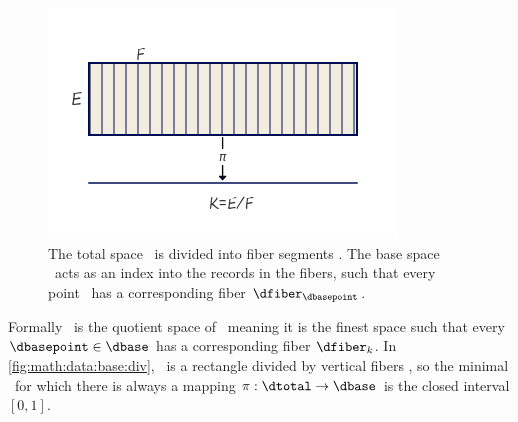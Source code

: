 \documentclass[../main.tex]{subfiles}
\begin{document}
\begin{figure}[H]
    \includegraphics[width=\linewidth]{figures/math/k_qspace.png}
    \caption{The total space \dtotal\ is divided into fiber segments \dfiber. The base space \dbase\ acts as an index into the records in the fibers, such that every point \dbasepoint\ has a corresponding fiber $\dfiber_{\dbasepoint}$.}
    \label{fig:math:data:base:div}
\end{figure}

Formally \dbase\ is the quotient space \cite{QuotientSpaceTopology2020} of \dtotal\, meaning it is the finest space\cite{aurouxMath131Introduction} such that every $\dbasepoint \in \dbase$ has a corresponding fiber $\dfiber_k$\cite{QuotientSpaceTopology2020}. In \autoref{fig:math:data:base:div}, \dtotal\ is a rectangle divided by vertical fibers \dfiber, so the minimal \dbase\ for which there is always a mapping $\pi: \dtotal\rightarrow \dbase$ is the closed interval $\left[0,1\right]$. 
\end{document}
